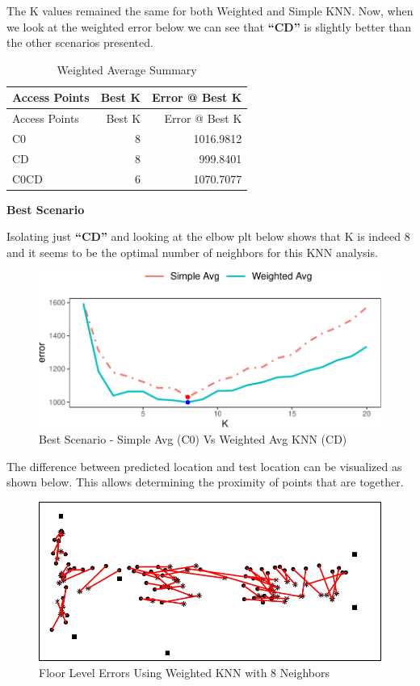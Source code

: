 \documentclass[
]{article}
\begin{document}
The K values remained the same for both Weighted and Simple KNN. Now,
when we look at the weighted error below we can see that \textbf{``CD''}
is slightly better than the other scenarios presented.

\begin{longtable}[]{@{}lrr@{}}
\caption{Weighted Average Summary}\tabularnewline
\toprule
Access Points & Best K & Error @ Best K\tabularnewline
\midrule
\endfirsthead
\toprule
Access Points & Best K & Error @ Best K\tabularnewline
\midrule
\endhead
C0 & 8 & 1016.9812\tabularnewline
CD & 8 & 999.8401\tabularnewline
C0CD & 6 & 1070.7077\tabularnewline
\bottomrule
\end{longtable}

\textbf{Best Scenario}

Isolating just \textbf{``CD''} and looking at the elbow plt below shows
that K is indeed 8 and it seems to be the optimal number of neighbors
for this KNN analysis.

\begin{figure}[H]

{\centering \includegraphics{msds7333_case_study01_files/figure-latex/unnamed-chunk-13-1} 

}

\caption{Best Scenario - Simple Avg (C0)  Vs Weighted Avg KNN (CD)}\label{fig:unnamed-chunk-13}
\end{figure}

The difference between predicted location and test location can be
visualized as shown below. This allows determining the proximity of
points that are together.

\begin{figure}[H]

{\centering \includegraphics{msds7333_case_study01_files/figure-latex/unnamed-chunk-14-1} 

}

\caption{Floor Level Errors Using Weighted KNN with 8 Neighbors}\label{fig:unnamed-chunk-14}
\end{figure}
\end{document}
